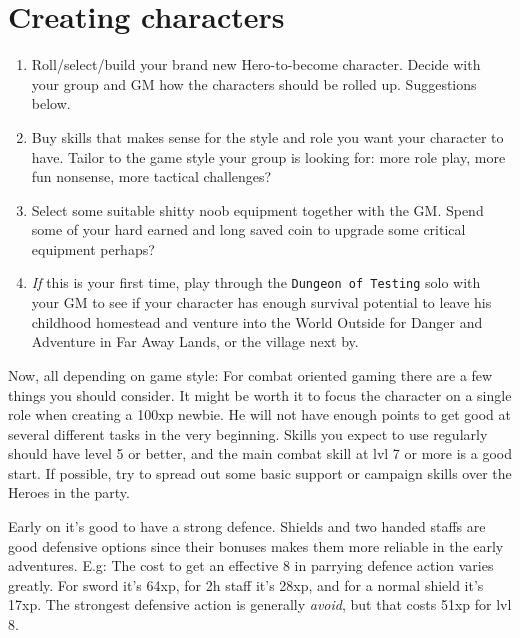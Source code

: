 \section*{Creating characters}

\begin{enumerate}
\item Roll/select/build your brand new Hero-to-become character. Decide with your group and GM how the characters should be rolled up. Suggestions below.
\item Buy skills that makes sense for the style and role you want your character to have. Tailor to the game style your group is looking for: more role play, more fun nonsense, more tactical challenges?
\item Select some suitable shitty noob equipment together with the GM. Spend some of your hard earned and long saved coin to upgrade some critical equipment perhaps?
\item \emph{If} this is your first time, play through the \texttt{Dungeon of Testing} solo with your GM to see if your character has enough survival potential to leave his childhood homestead and venture into the World Outside for Danger and Adventure in Far Away Lands, or the village next by.
\end{enumerate}

Now, all depending on game style: For combat oriented gaming there are a few things you should consider. It might be worth it to focus the character on a single role when creating a 100xp newbie. He will not have enough points to get good at several different tasks in the very beginning. Skills you expect to use regularly should have level 5 or better, and the main combat skill at lvl 7 or more is a good start. If possible, try to spread out some basic support or campaign skills over the Heroes in the party.

Early on it's good to have a strong defence. Shields and two handed staffs are good defensive options since their bonuses makes them more reliable in the early adventures. E.g: The cost to get an effective 8 in parrying defence action varies greatly. For sword it's 64xp, for 2h staff it's 28xp, and for a normal shield it's 17xp. The strongest defensive action is generally \emph{avoid}, but that costs 51xp for lvl 8.

